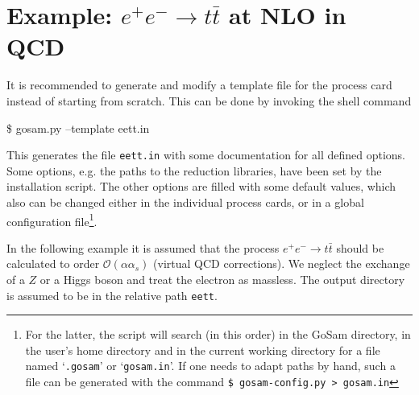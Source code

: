 \documentclass[11pt,a4paper]{refrep}
\newcommand{\gosamversion}{{2{.}0}}
\newcommand{\gosamv}[1][\gosamversion]{{\sc GoSam}\xspace}
\begin{document}
\section{Example: \texorpdfstring{$e^+e^-\rightarrow t\bar{t}$}{e+e- to tt-bar}
at NLO in QCD}

It is recommended to generate and modify a template file for the 
process card instead of
starting from scratch. This can be done by invoking the shell command
\begin{example}
\$ gosam.py --template eett.in
\end{example}
This generates the file \texttt{eett.in} with some documentation
for all defined options. Some options, e.g. the paths to the reduction libraries, 
have been set by the installation script.
The other options are filled with some default values,
which also can be changed either in the individual process cards, 
or in a global configuration file\footnote{
For the latter, the script will search (in this order) in the \gosamv{} directory,
in the user's home directory and in the current working directory for a file
named `\texttt{.gosam}' or `\texttt{gosam.in}'. If one needs to adapt paths by
hand, such a file can be generated with the command
{\tt \$ gosam-config.py > gosam.in}}.

In the following  example it is assumed that the process
$e^+e^-\rightarrow t\bar{t}$ should be calculated to order
$\mathcal{O}(\alpha\alpha_s)$ (virtual QCD corrections).
We neglect the exchange of a $Z$ or a Higgs boson and treat the electron as massless.
The output directory is assumed to be in the relative path
\texttt{eett}. 
\end{document}
